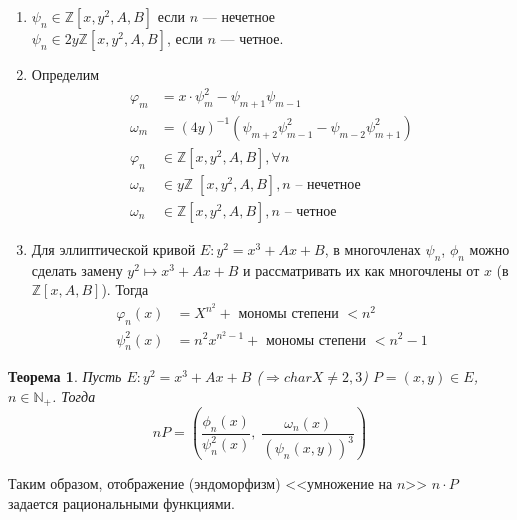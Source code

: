 \documentclass[12pt]{article}
\newcommand{\N}{{{\mathbb N}}}
\newcommand{\Z}{{{\mathbb Z}}}
\newtheorem{theorem}{Теорема}
\theoremstyle{definition}
\theoremstyle{definition}
\theoremstyle{definition}
\begin{document}
\begin{enumerate}
	\item 
    	${\psi _n} \in \Z[x, y^2, A, B]$ если $n$ — нечетное \\
    	${\psi _n} \in 2y\Z[x, y^2, A, B]$, если $n$ — четное. 
	\item Определим
    	\begin{align*}
    	{\varphi _m} &= x \cdot \psi _m^2 - {\psi _{m + 1}}{\psi _{m - 1}} \\
    	{\omega _m} &= {\left( {4y} \right)^{ - 1}}\left( {{\psi _{m + 2}}\psi _{m - 1}^2 - {\psi _{m - 2}}\psi _{m + 1}^2} \right) \\
    	{\varphi _n} &\in \Z\left[ {x, {y^2},A,B} \right], \forall n \\
    	{\omega _n} &\in y\Z\;\left[ {x, {y^2},A,B} \right], n{\text{  --  нечетное}} \\
    	{\omega _n} &\in \Z\left[ {x, {y^2},A,B} \right],n{\text{ -- четное}}
    	\end{align*}

	
	\item Для эллиптической кривой $E: {y^2} = {x^3} + Ax + B$, в многочленах ${\psi _n}$, ${\phi _n}$ можно сделать замену ${y^2} \mapsto {x^3} + Ax + B$ и рассматривать их как многочлены от $x$ (в $\Z\left[ {x,A,B} \right]$). Тогда 
    	\begin{align*}
    	{\varphi _n}\left( x \right) &= {X^{{n^2}}} + {\text{ мономы степени }} < {n^2} \\
    	\psi _n^2\left( x \right) &= {n^2}{x^{{n^2} - 1}} + {\text{ мономы степени }} < {n^2} - 1
    	\end{align*}

\end{enumerate}

\begin{theorem}
	\label{theor_03}
	Пусть $E: {y^2} = {x^3} + Ax + B$ ($ \Rightarrow char X \neq 2,3$) $P = \left( {x,y} \right) \in E$, $n \in {\N_+ }$. Тогда
	$$nP = \left( {\frac{{{\phi _n}\left( x \right)}}{{\psi _n^2\left( x \right)}},\;\frac{{{\omega _n}\left( x \right)}}{{{{\left( {{\psi _n}\left( {x,y} \right)} \right)}^3}}}} \right)
	$$
\end{theorem}

Таким образом, отображение (эндоморфизм) <<умножение на $n$>> $n \cdot P$ задается рациональными функциями.
\end{document}
